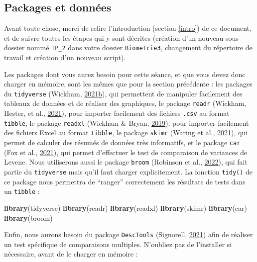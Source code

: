 \documentclass[
  a4paper,
]{article}
\newenvironment{Shaded}{\begin{snugshade}}{\end{snugshade}}
\newcommand{\KeywordTok}[1]{\textcolor[rgb]{0.12,0.11,0.11}{\textbf{#1}}}
\newcommand{\NormalTok}[1]{\textcolor[rgb]{0.12,0.11,0.11}{#1}}
\begin{document}
\hypertarget{packages-et-donnuxe9es}{%
\subsection{Packages et données}\label{packages-et-donnuxe9es}}

Avant toute chose, merci de relire l'introduction (section \ref{intro}) de ce document, et de suivre toutes les étapes qui y sont décrites (création d'un nouveau sous-dossier nommé \texttt{TP\_2} dans votre dossier \texttt{Biometrie3}, changement du répertoire de travail et création d'un nouveau script).

Les packages dont vous aurez besoin pour cette séance, et que vous devez donc charger en mémoire, sont les mêmes que pour la section précédente : les packages du \texttt{tidyverse} (Wickham, \protect\hyperlink{ref-R-tidyverse}{2021}\protect\hyperlink{ref-R-tidyverse}{b}), qui permettent de manipuler facilement des tableaux de données et de réaliser des graphiques, le package \texttt{readr} (Wickham, Hester, et al., \protect\hyperlink{ref-R-readr}{2021}), pour importer facilement des fichiers \texttt{.csv} au format \texttt{tibble}, le package \texttt{readxl} (Wickham \& Bryan, \protect\hyperlink{ref-R-readxl}{2019}), pour importer facilement des fichiers Excel au format \texttt{tibble}, le package \texttt{skimr} (Waring et al., \protect\hyperlink{ref-R-skimr}{2021}), qui permet de calculer des résumés de données très informatifs, et le package \texttt{car} (Fox et al., \protect\hyperlink{ref-R-car}{2021}), qui permet d'effectuer le test de comparaison de variances de Levene. Nous utiliserons aussi le package \texttt{broom} (Robinson et al., \protect\hyperlink{ref-R-broom}{2022}), qui fait partie du \texttt{tidyverse} mais qu'il faut charger explicitement. La fonction \texttt{tidy()} de ce package nous permettra de ``ranger'' correctement les résultats de tests dans un \texttt{tibble} :

\begin{Shaded}
\begin{Highlighting}[]
\KeywordTok{library}\NormalTok{(tidyverse)}
\KeywordTok{library}\NormalTok{(readr)}
\KeywordTok{library}\NormalTok{(readxl)}
\KeywordTok{library}\NormalTok{(skimr)}
\KeywordTok{library}\NormalTok{(car)}
\KeywordTok{library}\NormalTok{(broom)}
\end{Highlighting}
\end{Shaded}

Enfin, nous aurons besoin du package \texttt{DescTools} (Signorell, \protect\hyperlink{ref-R-DescTools}{2021}) afin de réaliser un test spécifique de comparaisons multiples. N'oubliez pas de l'installer si nécessaire, avant de le charger en mémoire :
\end{document}
